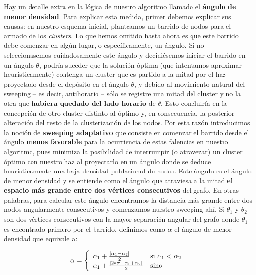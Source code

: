 Hay un detalle extra en la lógica de nuestro algoritmo llamado el \textbf{ángulo de menor densidad}. Para explicar esta medida, primer debemos explicar sus causas: en nuestro esquema inicial, planteamos un barrido de nodos para el armado de los \textit{clusters}. Lo que hemos omitido hasta ahora es que este barrido debe comenzar en algún lugar, o específicamente, un ángulo. Si no seleccionásemos cuidadosamente este ángulo y decidiésemos iniciar el barrido en un ángulo $\theta$, podría suceder que la solución óptima (que intentamos aproximar heurísticamente) contenga un cluster que es partido a la mitad por el haz proyectado desde el depósito en el ángulo $\theta$, y debido al movimiento natural del sweeping – es decir, antihorario – sólo se registre una mitad del cluster y no la otra que \textbf{hubiera quedado del lado horario} de $\theta$. Esto concluiría en la concepción de otro cluster distinto al óptimo y, en consecuencia, la posterior alteración del resto de la clusterización de los nodos. Por esta razón introducimos la noción de \textbf{sweeping adaptativo} que consiste en comenzar el barrido desde el ángulo \textbf{menos favorable} para la ocurriencia de estas falencias en nuestro algoritmo, pues minimiza la posibilidad de interrumpir (o atravezar) un cluster óptimo con nuestro haz al proyectarlo en un ángulo donde se deduce heurísticamente una baja densidad poblacional de nodos. Este ángulo es el ángulo de menor densidad y se entiende como el ángulo que atraviesa a la mitad \textbf{el espacio más grande entre dos vértices consecutivos} del grafo. En otras palabras, para calcular este ángulo encontramos la distancia más grande entre dos nodos angularmente consecutivos y comenzamos nuestro sweeping ahí. Si $\theta_{1}$ y $\theta_{2}$ son dos vértices consecutivos con la mayor separación angular del grafo donde $\theta_{1}$ es encontrado primero por el barrido, definimos como $\alpha$ el ángulo de menor densidad que equivale a:

\begin{center}
\begin{displaymath}
\alpha = \left\{
\begin{array}{l l}
			\alpha_{1} + \frac{|\alpha_{1} - \alpha_{2}|}{2} & \text{si }\alpha_{1} < \alpha_{2}\\
			\alpha_{1} + \frac{|2*\pi - \alpha_{1} + \alpha_{2}|}{2} & \text{sino}\\
\end{array}
\right.
\end{displaymath}
\end{center}

